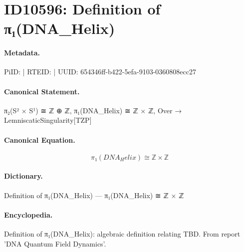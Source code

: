 \section*{ID10596: Definition of π₁(DNA\_Helix)}
\paragraph{Metadata.}
PiID:  | RTEID:  | UUID: 654346ff-b422-5efa-9103-0360808ecc27

\paragraph{Canonical Statement.}
π₂(S² × S¹) ≅ ℤ ⊕ ℤ, π₁(DNA\_Helix) ≅ ℤ × ℤ, Over → LemniscaticSingularity[TZP]

\paragraph{Canonical Equation.}
\[
π₁(DNA_Helix) ≅ ℤ × ℤ
\]

\paragraph{Dictionary.}
Definition of π₁(DNA\_Helix) — π₁(DNA\_Helix) ≅ ℤ × ℤ

\paragraph{Encyclopedia.}
Definition of π₁(DNA\_Helix): algebraic definition relating TBD. From report 'DNA Quantum Field Dynamics'.
